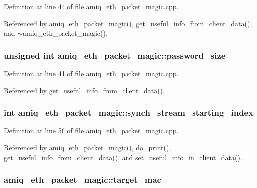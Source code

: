 Definition at line 44 of file amiq\_\-eth\_\-packet\_\-magic.cpp.

Referenced by amiq\_\-eth\_\-packet\_\-magic(), get\_\-useful\_\-info\_\-from\_\-client\_\-data(), and $\sim$amiq\_\-eth\_\-packet\_\-magic().\hypertarget{classamiq__eth__packet__magic_a9886d0fb22aecb6ff6223bc527391a46}{
\subsubsection[{password\_\-size}]{\setlength{\rightskip}{0pt plus 5cm}unsigned int {\bf amiq\_\-eth\_\-packet\_\-magic::password\_\-size}}}
\label{classamiq__eth__packet__magic_a9886d0fb22aecb6ff6223bc527391a46}


Definition at line 41 of file amiq\_\-eth\_\-packet\_\-magic.cpp.

Referenced by get\_\-useful\_\-info\_\-from\_\-client\_\-data().\hypertarget{classamiq__eth__packet__magic_adf2528cb7352ff0a1876232483803a4f}{
\subsubsection[{synch\_\-stream\_\-starting\_\-index}]{\setlength{\rightskip}{0pt plus 5cm}int {\bf amiq\_\-eth\_\-packet\_\-magic::synch\_\-stream\_\-starting\_\-index}}}
\label{classamiq__eth__packet__magic_adf2528cb7352ff0a1876232483803a4f}


Definition at line 56 of file amiq\_\-eth\_\-packet\_\-magic.cpp.

Referenced by amiq\_\-eth\_\-packet\_\-magic(), do\_\-print(), get\_\-useful\_\-info\_\-from\_\-client\_\-data(), and set\_\-useful\_\-info\_\-in\_\-client\_\-data().\hypertarget{classamiq__eth__packet__magic_a637e45b53f846df836bf9cc3ac3dfcd6}{
\subsubsection[{target\_\-mac}]{ {\bf amiq\_\-eth\_\-packet\_\-magic::target\_\-mac}}}
\label{classamiq__eth__packet__magic_a637e45b53f846df836bf9cc3ac3dfcd6}


